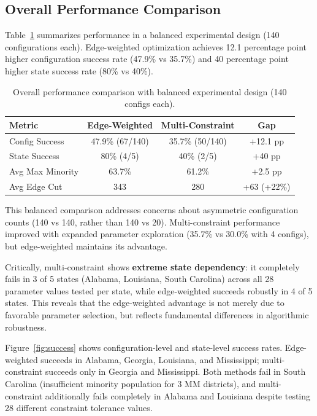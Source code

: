 \label{sec:results}

\subsection{Overall Performance Comparison}

Table~\ref{tab:overall} summarizes performance in a balanced experimental design (140 configurations each). Edge-weighted optimization achieves 12.1 percentage point higher configuration success rate (47.9\% vs 35.7\%) and 40 percentage point higher state success rate (80\% vs 40\%).

\begin{table}[t]
\centering
\caption{Overall performance comparison with balanced experimental design (140 configs each).}
\label{tab:overall}
\begin{tabular}{lccc}
\toprule
\textbf{Metric} & \textbf{Edge-Weighted} & \textbf{Multi-Constraint} & \textbf{Gap} \\
\midrule
Config Success & 47.9\% (67/140) & 35.7\% (50/140) & +12.1 pp \\
State Success & 80\% (4/5) & 40\% (2/5) & +40 pp \\
Avg Max Minority & 63.7\% & 61.2\% & +2.5 pp \\
Avg Edge Cut & 343 & 280 & +63 (+22\%) \\
\bottomrule
\end{tabular}
\end{table}

This balanced comparison addresses concerns about asymmetric configuration counts (140 vs 140, rather than 140 vs 20). Multi-constraint performance improved with expanded parameter exploration (35.7\% vs 30.0\% with 4 configs), but edge-weighted maintains its advantage.

Critically, multi-constraint shows \textbf{extreme state dependency}: it completely fails in 3 of 5 states (Alabama, Louisiana, South Carolina) across all 28 parameter values tested per state, while edge-weighted succeeds robustly in 4 of 5 states. This reveals that the edge-weighted advantage is not merely due to favorable parameter selection, but reflects fundamental differences in algorithmic robustness.

Figure~\ref{fig:success} shows configuration-level and state-level success rates. Edge-weighted succeeds in Alabama, Georgia, Louisiana, and Mississippi; multi-constraint succeeds only in Georgia and Mississippi. Both methods fail in South Carolina (insufficient minority population for 3 MM districts), and multi-constraint additionally fails completely in Alabama and Louisiana despite testing 28 different constraint tolerance values.

